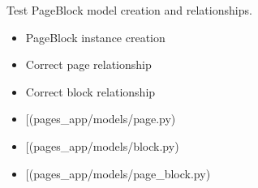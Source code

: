 \documentclass[letterpaper,10pt,english]{sphinxmanual}
\begin{document}
\begin{fulllineitems}
\begin{fulllineitems}
\begin{description}
\end{description}

\end{fulllineitems}


\begin{fulllineitems}
\label{\detokenize{pages_app.tests:pages_app.tests.test_models.PageBlockModelTest.test_pageblock_creation}}
\pysigstartsignatures
\pysiglinewithargsret
{}
{}
{}
\pysigstopsignatures
\sphinxAtStartPar
Test PageBlock model creation and relationships.
\begin{description}
\begin{itemize}
\item {} 
\sphinxAtStartPar
PageBlock instance creation

\item {} 
\sphinxAtStartPar
Correct page relationship

\item {} 
\sphinxAtStartPar
Correct block relationship

\end{itemize}

\begin{itemize}
\item {} 
\sphinxAtStartPar
{[}\sphinxtitleref{Page}{]}(pages\_app/models/page.py)

\item {} 
\sphinxAtStartPar
{[}\sphinxtitleref{Block}{]}(pages\_app/models/block.py)

\item {} 
\sphinxAtStartPar
{[}\sphinxtitleref{PageBlock}{]}(pages\_app/models/page\_block.py)

\end{itemize}

\end{description}

\end{fulllineitems}


\end{fulllineitems}

\end{document}
